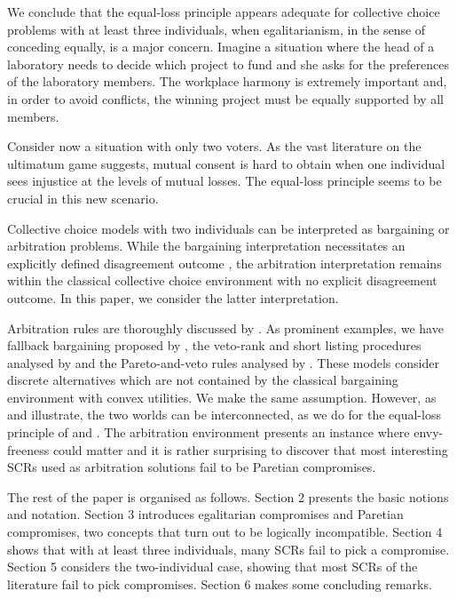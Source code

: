 We conclude that the equal-loss principle appears adequate for collective choice problems with at least three individuals, when egalitarianism, in the sense of conceding equally, is a major concern. Imagine a situation where the head of a laboratory needs to decide which project to fund and she asks for the preferences of the laboratory members. The workplace harmony is extremely important and, in order to avoid conflicts, the winning project must be equally supported by all members. 

Consider now a situation with only two voters. As the vast literature on the ultimatum game \citep{Werner2014} suggests, mutual consent is hard to obtain when one individual sees injustice at the levels of mutual losses. The equal-loss principle seems to be crucial in this new scenario.

Collective choice models with two individuals can be interpreted as bargaining or arbitration problems. While the bargaining interpretation necessitates an explicitly defined disagreement outcome \citep{Kibris2007}, the arbitration interpretation \citep{Sprumont1993} remains within the classical collective choice environment with no explicit disagreement outcome. In this paper, we consider the latter interpretation. 

Arbitration rules are thoroughly discussed by \citet{Barbera2020}. As prominent examples, we have fallback bargaining proposed by \citet{Brams2001}, the veto-rank and short listing procedures analysed by \citet{Clippel2014} and the Pareto-and-veto rules analysed by \citet{Laslier2020}. These models consider discrete alternatives which are not contained by the classical \citet{Nash1950} bargaining environment with convex utilities. We make the same assumption. However, as \citet{Mariotti1998} and \citet{Nagahisa2002} illustrate, the two worlds can be interconnected, as we do for the equal-loss principle of \citet{Chun1988} and \citet{Chun1991}. The arbitration environment presents an instance where envy-freeness could matter and it is rather surprising to discover that most interesting \acp{SCR} used as arbitration solutions fail to be Paretian compromises.

The rest of the paper is organised as follows. Section 2 presents the basic notions and notation. Section 3 introduces egalitarian compromises and Paretian compromises, two concepts that turn out to be logically incompatible. Section 4 shows that with at least three individuals, many \acp{SCR} fail to pick a compromise. Section 5 considers the two-individual case, showing that most \acp{SCR} of the literature fail to pick compromises. Section 6 makes some concluding remarks. 

